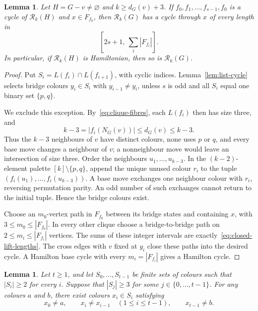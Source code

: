 \documentclass[11pt]{article}
\newtheorem{lemma}[theorem]{Lemma}
\theoremstyle{remark}
\newcommand{\Rk}{\mathcal R_k}
\numberwithin{equation}{section}
\numberwithin{table}{section}
\begin{document}
\begin{lemma}
\label{lem:single-lift}
Let $H=G-v\ne\varnothing$ and $k\ge d_G(v)+3$. If
$f_0,f_1,\ldots,f_{s-1},f_0$ is a cycle of $\Rk(H)$ and $x\in F_{f_0}$,
then $\Rk(G)$ has a cycle through $x$ of every length in
\begin{equation}\label{eq:closed-lift-lengths}
 [2s+1,\ \textstyle\sum_i|F_{f_i}|].
\end{equation}
In particular, if $\Rk(H)$ is Hamiltonian, then so is $\Rk(G)$.
\end{lemma}

\begin{proof}
Put $S_i=L(f_i)\cap L(f_{i+1})$, with cyclic indices.
Lemma~\ref{lem:list-cycle} selects bridge colours $y_i\in S_i$
with $y_{i-1}\ne y_i$, unless $s$ is odd and all $S_i$ equal
one binary set $\{p,q\}$.

We exclude this exception. By~\eqref{eq:clique-fibres}, each
$L(f_i)$ then has size three, and
\[
 k-3=|f_i(N_G(v))|\le d_G(v)\le k-3.
\]
Thus the $k-3$ neighbours of $v$ have distinct colours, none uses
$p$ or $q$, and every base move changes a neighbour of $v$;
a nonneighbour move would leave an intersection of size three.
Order the neighbours $u_1,\ldots,u_{k-3}$. In the $(k-2)$-element
palette $[k]\setminus\{p,q\}$, append the unique unused colour
$r_i$ to the tuple $(f_i(u_1),\ldots,f_i(u_{k-3}))$.
A base move exchanges one neighbour colour with $r_i$, reversing
permutation parity. An odd number of such exchanges cannot return
to the initial tuple. Hence the bridge colours exist.

Choose an $m_0$-vertex path in $F_{f_0}$ between its bridge states
and containing $x$, with $3\le m_0\le|F_{f_0}|$.
In every other clique choose a bridge-to-bridge path on
$2\le m_i\le|F_{f_i}|$ vertices. The sums of these integer intervals
are exactly~\eqref{eq:closed-lift-lengths}. The cross edges with $v$
fixed at $y_i$ close these paths into the desired cycle. A Hamilton
base cycle with every $m_i=|F_{f_i}|$ gives a Hamilton cycle.
\end{proof}

\begin{lemma}\label{lem:bridge-colours}
Let $t\ge1$, and let $S_0,\ldots,S_{t-1}$ be finite sets of colours
such that $|S_i|\ge2$ for every $i$. Suppose that $|S_j|\ge3$ for
some $j\in\{0,\ldots,t-1\}$. For any colours $a$ and $b$, there exist
colours $x_i\in S_i$ satisfying
\[
x_0\ne a,\qquad
x_i\ne x_{i-1}\quad(1\le i\le t-1),\qquad
x_{t-1}\ne b.
\]
\end{lemma}
\end{document}
